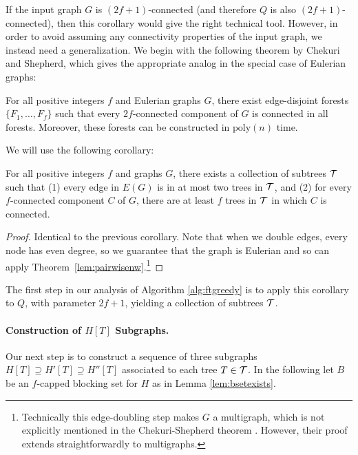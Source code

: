If the input graph $G$ is $(2f+1)$-connected (and therefore $Q$ is also $(2f+1)$-connected), then this corollary would give the right technical tool.
However, in order to avoid assuming any connectivity properties of the input graph, we instead need a generalization.
We begin with the following theorem by Chekuri and Shepherd, which gives the appropriate analog in the special case of Eulerian graphs:
\begin{theorem} \label{lem:pairwisenw}
For all positive integers $f$ and Eulerian graphs $G$, there exist edge-disjoint forests $\{F_1, \dots, F_f\}$ such that every $2f$-connected component of $G$ is connected in all forests.
Moreover, these forests can be constructed in $\text{poly}(n)$ time.
\end{theorem}

We will use the following corollary:
\begin{corollary} \label{cor:pairwisenw}
For all positive integers $f$ and graphs $G$, there exists a collection of subtrees $\mathcal{T}$ such that (1) every edge in $E(G)$ is in at most two trees in $\mathcal{T}$, and (2) for every $f$-connected component $C$ of $G$, there are at least $f$ trees in $\mathcal{T}$ in which $C$ is connected.  
\end{corollary}
\begin{proof}
Identical to the previous corollary.
Note that when we double edges, every node has even degree, so we guarantee that the graph is Eulerian and so can apply Theorem~\ref{lem:pairwisenw}.\footnote{Technically this edge-doubling step makes $G$ a multigraph, which is not explicitly mentioned in the Chekuri-Shepherd theorem \cite{chekuri2009approximate}.  However, their proof extends straightforwardly to multigraphs.}
\end{proof}

The first step in our analysis of Algorithm \ref{alg:ftgreedy} is to apply this corollary to $Q$, with parameter $2f+1$, yielding a collection of subtrees $\mathcal{T}$.

\paragraph{Construction of $H[T]$ Subgraphs.} Our next step is to construct a sequence of three subgraphs $H[T] \supseteq H'[T] \supseteq H''[T]$ associated to each tree $T \in \mathcal{T}$.
In the following let $B$ be an $f$-capped blocking set for $H$ as in Lemma \ref{lem:bsetexists}.

